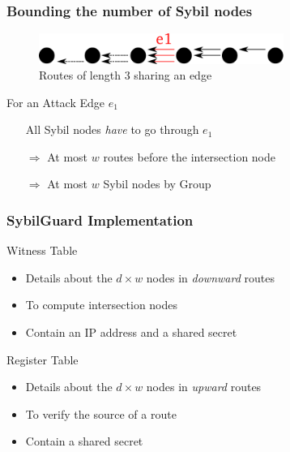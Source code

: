 \documentclass{beamer}
\begin{document}

\begin{frame}

  \frametitle{Bounding the number of Sybil nodes}

  \begin{figure}
    \includegraphics[width=8cm]{./pictures/bound_nodes} 
    \caption{Routes of length 3 sharing an edge}
  \end{figure}
  
  \begin{block}{For an Attack Edge $e_1$}
    \begin{itemize}
      \item[] All Sybil nodes \emph{have} to go through $e_1$
      \item[$\Rightarrow$] At most $w$ routes before the intersection node %
      \item[$\Rightarrow$] At most $w$ Sybil nodes by Group
    \end{itemize}
  \end{block}

\end{frame}


\begin{frame}

  \frametitle{SybilGuard Implementation}

  \begin{block}{Witness Table}
    \begin{itemize}
    \item Details about the $d \times w$ nodes in \emph{downward} routes
    \item To compute intersection nodes
    \item Contain an IP address and a shared secret
    \end{itemize}
  \end{block}

  \begin{block}{Register Table}
    \begin{itemize}
    \item Details about the $d \times w$ nodes in \emph{upward} routes
    \item To verify the source of a route
    \item Contain a shared secret
    \end{itemize}
  \end{block}

\end{frame}


\end{document}
